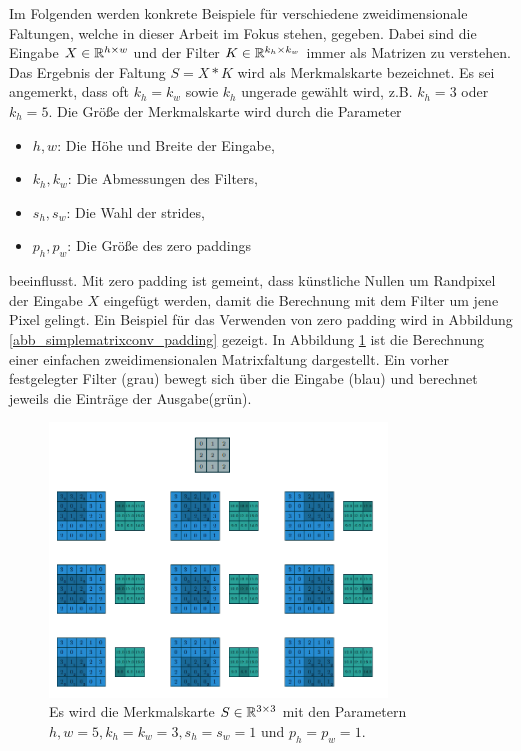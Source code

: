 Im Folgenden werden konkrete Beispiele für verschiedene zweidimensionale Faltungen, welche in dieser Arbeit im Fokus stehen, gegeben. Dabei sind die Eingabe $X \in \mathbb{R}^{h \times w}$ und der Filter $K \in \mathbb{R}^{k_h \times k_w}$ immer als Matrizen zu verstehen. Das Ergebnis der Faltung $S= X \ast K$ wird als Merkmalskarte bezeichnet. Es sei angemerkt, dass oft $k_h=k_w$ sowie $k_h$ ungerade gewählt wird, z.B. $k_h=3$ oder $k_h=5$. Die Größe der Merkmalskarte wird durch die Parameter
\begin{itemize}
    \item $h,w$: Die Höhe und Breite der Eingabe,
    \item $k_h, k_w$: Die Abmessungen des Filters,
    \item $s_h, s_w$: Die Wahl der strides, 
    \item $p_h, p_w$: Die Größe des zero paddings
\end{itemize}
beeinflusst. Mit zero padding ist gemeint, dass künstliche Nullen um Randpixel der Eingabe $X$ eingefügt werden, damit die Berechnung mit dem Filter um jene Pixel gelingt. Ein Beispiel für das Verwenden von zero padding wird in Abbildung \ref{abb_simplematrixconv_padding} gezeigt. In Abbildung \ref{abb_simplematrixconv} ist die Berechnung einer einfachen zweidimensionalen Matrixfaltung dargestellt. Ein vorher festgelegter Filter (grau) bewegt sich über die Eingabe (blau) und berechnet jeweils die Einträge der Ausgabe(grün). 

\begin{figure}[h]
    \includegraphics[width=0.8\textwidth]{pics/abb_simpleconv}
    \centering
    \caption{Es wird die Merkmalskarte $S \in \mathbb{R}^{3 \times 3}$ mit den Parametern ${h,w=5}, k_h=k_w=3, s_h=s_w=1$ und $p_h=p_w=1.$}
    \label{abb_simplematrixconv}
\end{figure}

